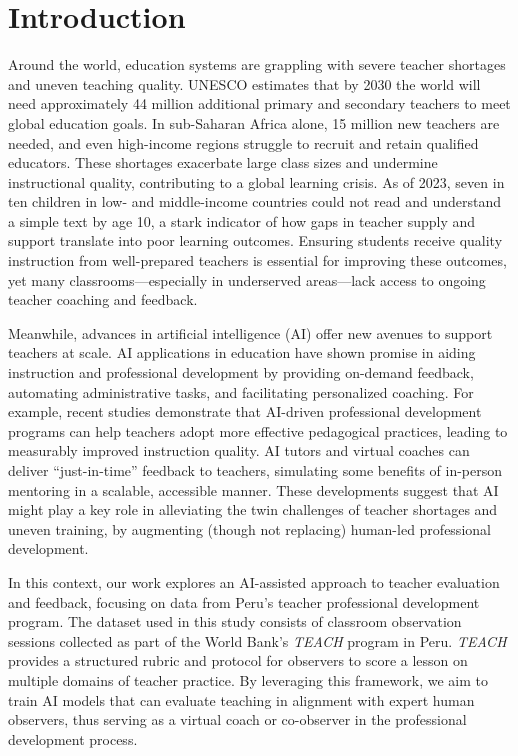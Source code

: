 \documentclass[12pt]{article}
\begin{document}
\section{Introduction}
\label{sec:intro}
\noindent Around the world, education systems are grappling with severe teacher shortages and uneven teaching quality. UNESCO estimates that by 2030 the world will need approximately 44 million additional primary and secondary teachers to meet global education goals. In sub-Saharan Africa alone, 15 million new teachers are needed, and even high-income regions struggle to recruit and retain qualified educators. These shortages exacerbate large class sizes and undermine instructional quality, contributing to a global learning crisis. As of 2023, seven in ten children in low- and middle-income countries could not read and understand a simple text by age 10, a stark indicator of how gaps in teacher supply and support translate into poor learning outcomes. Ensuring students receive quality instruction from well-prepared teachers is essential for improving these outcomes, yet many classrooms—especially in underserved areas—lack access to ongoing teacher coaching and feedback.

Meanwhile, advances in artificial intelligence (AI) offer new avenues to support teachers at scale. AI applications in education have shown promise in aiding instruction and professional development by providing on-demand feedback, automating administrative tasks, and facilitating personalized coaching. For example, recent studies demonstrate that AI-driven professional development programs can help teachers adopt more effective pedagogical practices, leading to measurably improved instruction quality. AI tutors and virtual coaches can deliver “just-in-time” feedback to teachers, simulating some benefits of in-person mentoring in a scalable, accessible manner. These developments suggest that AI might play a key role in alleviating the twin challenges of teacher shortages and uneven training, by augmenting (though not replacing) human-led professional development.

In this context, our work explores an AI-assisted approach to teacher evaluation and feedback, focusing on data from Peru’s teacher professional development program. The dataset used in this study consists of classroom observation sessions collected as part of the World Bank’s \textit{TEACH} program in Peru. \textit{TEACH} provides a structured rubric and protocol for observers to score a lesson on multiple domains of teacher practice. By leveraging this framework, we aim to train AI models that can evaluate teaching in alignment with expert human observers, thus serving as a virtual coach or co-observer in the professional development process.
\end{document}

